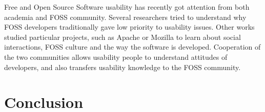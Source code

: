 \documentclass{chi2009}
\begin{document}
Free and Open Source Software usability has recently got attention from both academia and FOSS community. Several researchers \cite{nichols:usability:2003,andreasen:usability:2006} tried to understand why FOSS developers traditionally gave low priority to usability issues. Other works studied particular projects, such as Apache \cite{mockus:apache:2000} or Mozilla \cite{mockus:mozilla:2002} to learn about social interactions, FOSS culture and the way the software is developed. Cooperation of the two communities allows usability people to understand attitudes of developers, and also transfers usability knowledge to the FOSS community.

\section{Conclusion}\label{sec:conclusion}



\end{document}
